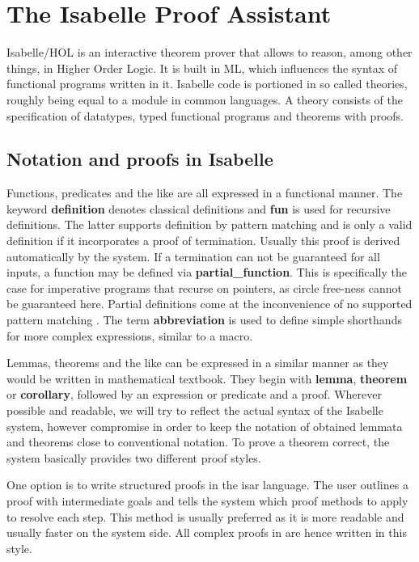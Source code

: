 \section{The Isabelle Proof Assistant}

Isabelle/HOL is an interactive theorem prover that allows
to reason, among other things, in Higher Order Logic.\parencite{DBLP:books/sp/NipkowPW02}
It is built in ML, which influences the syntax of functional
programs written in it.
Isabelle code is portioned in so called theories,
roughly being equal to a module in common languages.
A theory consists of the specification of datatypes,
typed functional programs and theorems with proofs.

\subsection{Notation and proofs in Isabelle}

Functions, predicates and the like are all expressed in
a functional manner.
The keyword \textbf{definition} denotes classical definitions
and \textbf{fun} is used for recursive definitions.
The latter supports definition by pattern matching and
is only a valid definition if it incorporates a proof of termination.
Usually this proof is derived automatically by the system.
If a termination can not be guaranteed for all inputs,
a function may be defined via \textbf{partial\_function}.
This is specifically the case for imperative programs
that recurse on pointers, as circle free-ness cannot be guaranteed here.
Partial definitions come at the inconvenience of no
supported pattern matching \parencite{isabelleManual}.
The term \textbf{abbreviation} is used to define simple shorthands for more complex expressions,
similar to a macro.

Lemmas, theorems and the like can be expressed in a similar manner
as they would be written in mathematical textbook.
They begin with \textbf{lemma}, \textbf{theorem} or \textbf{corollary},
followed by an expression or predicate and a proof.
Wherever possible and readable, we will try to reflect the actual
syntax of the Isabelle system, however compromise in order to
keep the notation of obtained lemmata and theorems
close to conventional notation.
To prove a theorem correct, the system basically provides two different
proof styles.

One option is to write structured proofs in the isar language.
The user outlines a proof with intermediate goals
and tells the system which proof methods to apply to
resolve each step.
This method is usually preferred as it is more readable and usually
faster on the system side.
All complex proofs in  are hence written in this style.

